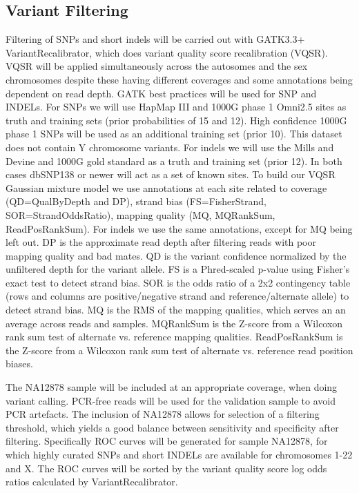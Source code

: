 \subsection{Variant Filtering}
Filtering of SNPs and short indels will be carried out with GATK3.3+ VariantRecalibrator, which does variant quality score recalibration (VQSR). VQSR will be applied simultaneously across the autosomes and the sex chromosomes despite these having different coverages and some annotations being dependent on read depth. GATK best practices will be used for SNP and INDELs.
For SNPs we will use HapMap III and 1000G phase 1 Omni2.5 sites as truth and training sets (prior probabilities of 15 and 12). High confidence 1000G phase 1 SNPs will be used as an additional training set (prior 10). This dataset does not contain Y chromosome variants. For indels we will use the Mills and Devine and 1000G gold standard as a truth and training set (prior 12). In both cases dbSNP138 or newer will act as a set of known sites.
To build our VQSR Gaussian mixture model we use annotations at each site related to coverage (QD=QualByDepth and DP), strand bias (FS=FisherStrand, SOR=StrandOddsRatio), mapping quality (MQ, MQRankSum, ReadPosRankSum). For indels we use the same annotations, except for MQ being left out.
DP is the approximate read depth after filtering reads with poor mapping quality and bad mates. QD is the variant confidence normalized by the unfiltered depth for the variant allele. FS is a Phred-scaled p-value using Fisher's exact test to detect strand bias. SOR is the odds ratio of a 2x2 contingency table (rows and columns are positive/negative strand and reference/alternate allele) to detect strand bias. MQ is the RMS of the mapping qualities, which serves an an average across reads and samples. MQRankSum is the Z-score from a Wilcoxon rank sum test of alternate vs. reference mapping qualities. ReadPosRankSum is the Z-score from a Wilcoxon rank sum test of alternate vs. reference read position biases.

The NA12878 sample will be included at an appropriate coverage, when doing variant calling. PCR-free reads will be used for the validation sample to avoid PCR artefacts. The inclusion of NA12878 allows for selection of a filtering threshold, which yields a good balance between sensitivity and specificity after filtering. Specifically ROC curves will be generated for sample NA12878, for which highly curated SNPs and short INDELs are available for chromosomes 1-22 and X. The ROC curves will be sorted by the variant quality score log odds ratios calculated by VariantRecalibrator.

